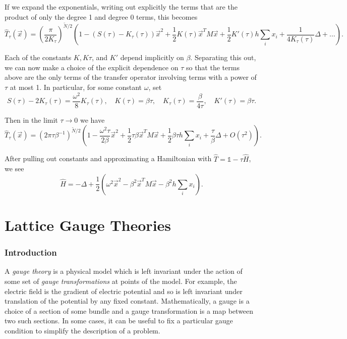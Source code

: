 \documentclass[11pt,reqno]{amsart}
\numberwithin{equation}{section}
\begin{document}
	If we expand the exponentials, writing out explicitly the terms that are the product of only the degree 1 and degree 0 terms, this becomes
	\begin{equation}
		\hat{T}_\tau(\vec{x}) = \left(\frac{\pi}{2K_\tau} \right)^{\widetilde{N}/2} \left( 1 -(S(\tau)-K_\tau(\tau))\vec{x}^2+\frac{1}{2}K(\tau)\vec{x}^T M \vec{x} + \frac{1}{2} K'(\tau)h\sum_{i} x_i + \frac{1}{4K_\tau(\tau)}\Delta + \ldots \right).
	\end{equation}
	
	Each of the constants $K, K\tau$, and $K'$ depend implicitly on $\beta$. 
	Separating this out, we can now make a choice of the explicit dependence on $\tau$ so that the terms above are the only terms of the transfer operator involving terms with a power of $\tau$ at most 1.
	In particular, for some constant $\omega$, set
	\begin{equation}
		S(\tau)-2K_\tau(\tau)=\frac{\omega^2}{8}K_\tau(\tau), \quad K(\tau)=\beta \tau, \quad K_\tau(\tau)=\frac{\beta}{4\tau}, \quad K'(\tau)=\beta\tau.
	\end{equation}
	
	Then in the limit $\tau \to 0$ we have 
	\begin{equation}
		\hat{T}_\tau(\vec{x})=(2\pi \tau \beta^{-1})^{\widetilde{N}/2} \left( 1-\frac{\omega^2\tau}{2\beta}\vec{x}^2+\frac{1}{2}\tau\beta \vec{x}^T M \vec{x} +\frac{1}{2}\beta\tau h \sum_i x_i +\frac{\tau}{\beta} \Delta + O(\tau^2) \right).
	\end{equation}
	
	After pulling out constants and approximating a Hamiltonian with $\hat{T}=\mathds{1}-\tau\hat{H}$, we see
	\begin{equation}
		\hat{H} = -\Delta+ \frac{1}{2}(\omega^2\vec{x}^2-\beta^2 \vec{x}^TM\vec{x}-\beta^2 h \sum_i x_i).
	\end{equation}
	
		\part{Lattice Gauge Theories}
	\section{Introduction}
	
	A \emph{gauge theory} is a physical model which is left invariant under the action of some set of \emph{gauge transformations} at points of the model.
	For example, the electric field is the gradient of electric potential and so is left invariant under translation of the potential by any fixed constant.
	Mathematically, a gauge is a choice of a section of some bundle and a gauge transformation is a map between two such sections.
	In some cases, it can be useful to fix a particular gauge condition to simplify the description of a problem.	
			
\end{document}
